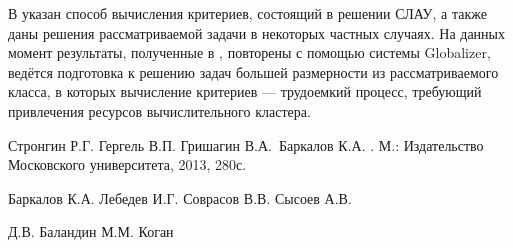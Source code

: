 \documentclass[11pt, oneside, a4paper]{article}
\begin{document}
В \cite{optControl} указан способ вычисления критериев, состоящий в решении СЛАУ,
а также даны решения рассматриваемой задачи в некоторых частных случаях. На
данных момент результаты, полученные в \cite{optControl}, повторены с помощью системы Globalizer,
ведётся подготовка к решению задач большей размерности из рассматриваемого класса, в которых
вычисление критериев --- трудоемкий процесс, требующий привлечения ресурсов вычислительного кластера.

\begin{biblio}

Стронгин Р.Г. Гергель В.П. Гришагин
  В.А.~Баркалов К.А.
.
\newblock М.: Издательство Московского
  университета, 2013, 280с.

Баркалов К.А. Лебедев И.Г. Соврасов В.В. Сысоев А.В.

 Д.В. Баландин М.М. Коган

\end{biblio}
\end{document}
